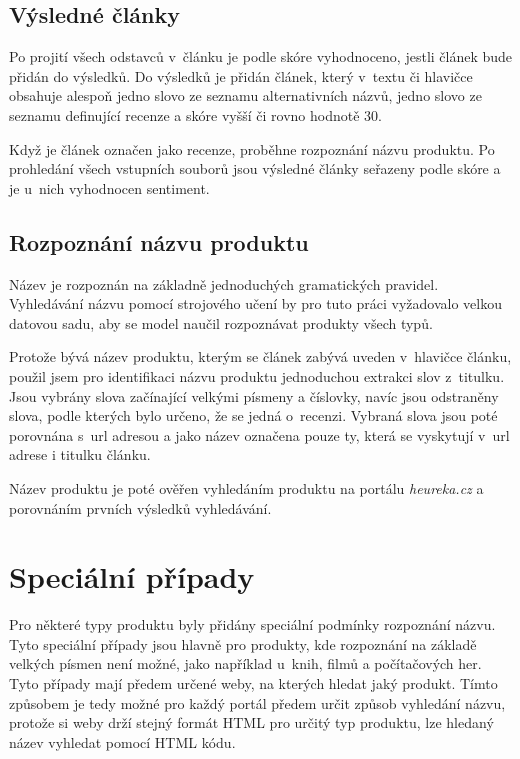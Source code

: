 \subsection*{Výsledné články}
Po projití všech odstavců v~článku je podle skóre vyhodnoceno, jestli článek bude přidán do výsledků. Do výsledků je přidán článek, který v~textu či hlavičce obsahuje alespoň jedno slovo ze seznamu alternativních názvů, jedno slovo ze seznamu definující recenze a skóre vyšší či rovno hodnotě 30.

Když je článek označen jako recenze, proběhne rozpoznání názvu produktu. Po prohledání všech vstupních souborů jsou výsledné články seřazeny podle skóre a je u~nich vyhodnocen sentiment.

\subsection*{Rozpoznání názvu produktu}

Název je rozpoznán na základně jednoduchých gramatických pravidel. Vyhledávání názvu pomocí strojového učení by pro tuto práci vyžadovalo velkou datovou sadu, aby se model naučil rozpoznávat produkty všech typů.

Protože bývá název produktu, kterým se článek zabývá uveden v~hlavičce článku, použil jsem pro identifikaci názvu produktu jednoduchou extrakci slov z~titulku. Jsou vybrány slova začínající velkými písmeny a číslovky, navíc jsou odstraněny slova, podle kterých bylo určeno, že se jedná o~recenzi. Vybraná slova jsou poté porovnána s~url adresou a jako název označena pouze ty, která se vyskytují v~url adrese i titulku článku.

Název produktu je poté ověřen vyhledáním produktu na portálu \textit{heureka.cz} a porovnáním prvních výsledků vyhledávání.

\section{Speciální případy}
Pro některé typy produktu byly přidány speciální podmínky rozpoznání názvu. Tyto speciální případy jsou hlavně pro produkty, kde rozpoznání na základě velkých písmen není možné, jako například u~knih, filmů a počítačových her. Tyto případy mají předem určené weby, na kterých hledat jaký produkt. Tímto způsobem je tedy možné pro každý portál předem určit způsob vyhledání názvu, protože si weby drží stejný formát HTML pro určitý typ produktu, lze hledaný název vyhledat pomocí HTML kódu.

